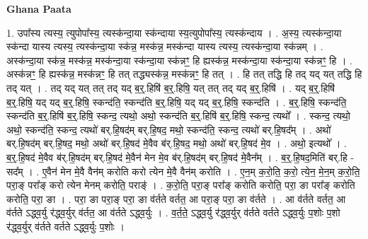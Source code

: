 \documentclass[17pt]{extarticle}
\begin{document}
\textbf{Ghana Paata } \newline

1. उपा᳚स्य त्यस्य॒ त्युपोपा᳚स्य॒ त्यस्क॑न्दा॒या स्क॑न्दाया स्य॒त्युपोपा᳚स्य॒ त्यस्क॑न्दाय । . अ॒स्य॒ त्यस्क॑न्दा॒या स्क॑न्दा यास्य त्यस्य॒ त्यस्क॑न्दा॒या स्क॑न्न॒ मस्क॑न्न॒ मस्क॑न्दा यास्य त्यस्य॒ त्यस्क॑न्दा॒या स्क॑न्नम् । . अस्क॑न्दा॒या स्क॑न्न॒ मस्क॑न्न॒ मस्क॑न्दा॒या स्क॑न्दा॒या स्क॑न्नꣳ॒॒ हि ह्यस्क॑न्न॒ मस्क॑न्दा॒या स्क॑न्दा॒या स्क॑न्नꣳ॒॒ हि । . अस्क॑न्नꣳ॒॒ हि ह्यस्क॑न्न॒ मस्क॑न्नꣳ॒॒ हि तत् तद्ध्यस्क॑न्न॒ मस्क॑न्नꣳ॒॒ हि तत् । . हि तत् तद्धि हि तद् यद् यत् तद्धि हि तद् यत् । . तद् यद् यत् तत् तद् यद् ब॒र्॒.हिषि॑ ब॒र्॒.हिषि॒ यत् तत् तद् यद् ब॒र्॒.हिषि॑ । . यद् ब॒र्॒.हिषि॑ ब॒र्॒.हिषि॒ यद् यद् ब॒र्॒.हिषि॒ स्कन्द॑ति॒ स्कन्द॑ति ब॒र्॒.हिषि॒ यद् यद् ब॒र्॒.हिषि॒ स्कन्द॑ति । . ब॒र्॒.हिषि॒ स्कन्द॑ति॒ स्कन्द॑ति ब॒र्॒.हिषि॑ ब॒र्॒.हिषि॒ स्कन्द॒ त्यथो॒ अथो॒ स्कन्द॑ति ब॒र्॒.हिषि॑ ब॒र्॒.हिषि॒ स्कन्द॒ त्यथो᳚ । . स्कन्द॒ त्यथो॒ अथो॒ स्कन्द॑ति॒ स्कन्द॒ त्यथो॑ बर्.हि॒षद॑म् बर्.हि॒षद॒ मथो॒ स्कन्द॑ति॒ स्कन्द॒ त्यथो॑ बर्.हि॒षद᳚म् । . अथो॑ बर्.हि॒षद॑म् बर्.हि॒षद॒ मथो॒ अथो॑ बर्.हि॒षद॑ मे॒वैव ब॑र्.हि॒षद॒ मथो॒ अथो॑ बर्.हि॒षद॑ मे॒व । . अथो॒ इत्यथो᳚ । . ब॒र्॒.हि॒षद॑ मे॒वैव ब॑र्.हि॒षद॑म् बर्.हि॒षद॑ मे॒वैन॑ मेन मे॒व ब॑र्.हि॒षद॑म् बर्.हि॒षद॑ मे॒वैन᳚म् । . ब॒र्॒.हि॒षद॒मिति॑ बर्.हि - सद᳚म् । . ए॒वैन॑ मेन मे॒वै वैन॑म् करोति करो त्येन मे॒वै वैन॑म् करोति । . ए॒न॒म् क॒रो॒ति॒ क॒रो॒ त्ये॒न॒ मे॒न॒म् क॒रो॒ति॒ परा॒ङ् परा᳚ङ् करो त्येन मेनम् करोति॒ पराङ्॑ । . क॒रो॒ति॒ परा॒ङ् परा᳚ङ् करोति करोति॒ परा॒ ङा परा᳚ङ् करोति करोति॒ परा॒ ङा । . परा॒ ङा परा॒ङ् परा॒ ङा व॑र्तते वर्तत॒ आ परा॒ङ् परा॒ ङा व॑र्तते । . आ व॑र्तते वर्तत॒ आ व॑र्तते ऽद्ध्व॒र्यु र॑द्ध्व॒र्युर् व॑र्तत॒ आ व॑र्तते ऽद्ध्व॒र्युः । . व॒र्त॒ते॒ ऽद्ध्व॒र्यु र॑द्ध्व॒र्युर् व॑र्तते वर्तते ऽद्ध्व॒र्युः प॒शोः प॒शो र॑द्ध्व॒र्युर् व॑र्तते वर्तते ऽद्ध्व॒र्युः प॒शोः । \newline
\end{document}
